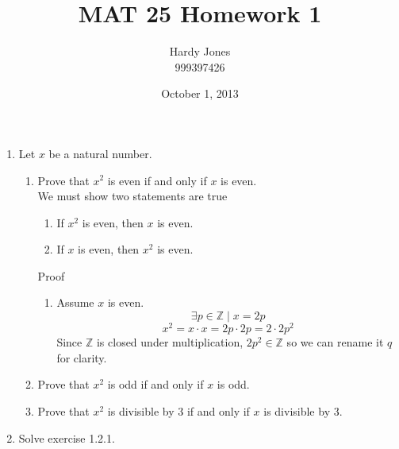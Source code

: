 \documentclass[12pt]{article}
\begin{document}
\title{MAT 25 Homework 1}
\author{Hardy Jones\\
        999397426}
\date{October 1, 2013}

\maketitle

\begin{enumerate}
    \item Let $x$ be a natural number.
    \begin{enumerate}
        \item Prove that $x^2$ is even if and only if $x$ is even. \\

            We must show two statements are true
            \begin{enumerate}
                \item If $x^2$ is even, then $x$ is even.
                \item If $x$ is even, then $x^2$ is even.
            \end{enumerate}

            Proof

            \begin{enumerate}
                \item
                    Assume $x$ is even.
                    \[\exists p \in \mathbb{Z} \mid x = 2p\]
                    \[x^2 = x \cdot x = 2p \cdot 2p = 2 \cdot 2p^2\]
                    Since $\mathbb{Z}$ is closed under multiplication,
                    $2p^2 \in \mathbb{Z}$ so we can rename it $q$ for clarity.
                    \[\]
            \end{enumerate}

        \item Prove that $x^2$ is odd if and only if $x$ is odd.

        \item Prove that $x^2$ is divisible by $3$ if and only if
              $x$ is divisible by $3$.
    \end{enumerate}

    \item Solve exercise 1.2.1.
\end{enumerate}
\end{document}
